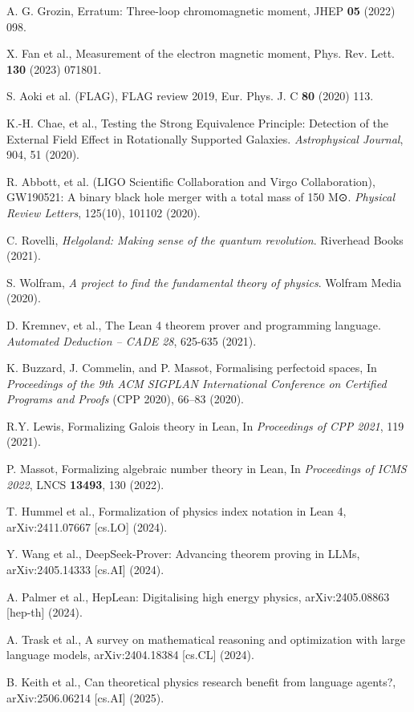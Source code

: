 \documentclass[11pt,a4paper]{article}
\begin{document}
\begin{thebibliography}{99}
A. G. Grozin, Erratum: Three-loop chromomagnetic moment, JHEP \textbf{05} (2022) 098.

X. Fan et al., Measurement of the electron magnetic moment, Phys. Rev. Lett. \textbf{130} (2023) 071801.

S. Aoki et al. (FLAG), FLAG review 2019, Eur. Phys. J. C \textbf{80} (2020) 113.

K.-H. Chae, et al., Testing the Strong Equivalence Principle: Detection of the External Field Effect in Rotationally Supported Galaxies. \textit{Astrophysical Journal}, 904, 51 (2020).

R. Abbott, et al. (LIGO Scientific Collaboration and Virgo Collaboration), GW190521: A binary black hole merger with a total mass of 150 M⊙. \textit{Physical Review Letters}, 125(10), 101102 (2020).

C. Rovelli, \textit{Helgoland: Making sense of the quantum revolution}. Riverhead Books (2021).

S. Wolfram, \textit{A project to find the fundamental theory of physics}. Wolfram Media (2020).

D. Kremnev, et al., The Lean 4 theorem prover and programming language. \textit{Automated Deduction – CADE 28}, 625-635 (2021).

K. Buzzard, J. Commelin, and P. Massot,
Formalising perfectoid spaces,
In \textit{Proceedings of the 9th ACM SIGPLAN International Conference on Certified Programs and Proofs} (CPP 2020), 66--83 (2020).

R.Y. Lewis, Formalizing Galois theory in Lean, In \textit{Proceedings of CPP 2021}, 119 (2021).

P. Massot, Formalizing algebraic number theory in Lean, In \textit{Proceedings of ICMS 2022}, LNCS \textbf{13493}, 130 (2022).

T. Hummel et al., Formalization of physics index notation in Lean 4, arXiv:2411.07667 [cs.LO] (2024).

Y. Wang et al., DeepSeek-Prover: Advancing theorem proving in LLMs, arXiv:2405.14333 [cs.AI] (2024).

A. Palmer et al., HepLean: Digitalising high energy physics, arXiv:2405.08863 [hep-th] (2024).

A. Trask et al., A survey on mathematical reasoning and optimization with large language models, arXiv:2404.18384 [cs.CL] (2024).

B. Keith et al., Can theoretical physics research benefit from language agents?, arXiv:2506.06214 [cs.AI] (2025).

\end{thebibliography}
\end{document}
